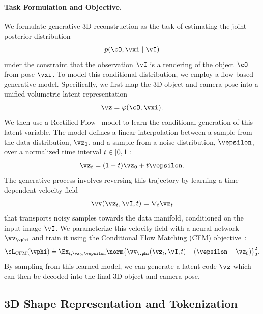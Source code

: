 \documentclass[../../book-main.tex]{subfiles}
\begin{document}
\paragraph{Task Formulation and Objective.}
We formulate generative 3D reconstruction as the task of estimating
the joint posterior distribution
\begin{equation}
p(\object, \pose \mid \image)
\end{equation}
under the constraint that the observation \(\image\) is a rendering of
the object \(\object\) from pose \(\pose\).
To model this conditional distribution, we employ a flow-based generative model.
Specifically, we first map the 3D object and camera pose into a unified volumetric
latent representation
\begin{equation}
\latent = \encoder(\object, \pose) .
\end{equation}
We then use a Rectified Flow~\citep{lipmanflow} model to learn the conditional
generation of this latent variable.
The model defines a linear interpolation between a sample from the data distribution,
\(\latentzero\), and a sample from a noise distribution, \(\noise\), over
a normalized time interval \(t \in [0, 1]\):
\begin{equation}
\latentt = (1 - \timestep) \latentzero + \timestep \noise .
\end{equation}
The generative process involves reversing this trajectory by learning
a time-dependent velocity field
\begin{equation}
\velocity(\latentt, \image, \timestep) = \nabla_{\timestep} \latentt
\end{equation}
that transports noisy samples towards the data manifold, conditioned
on the input image \(\image\).
We parameterize this velocity field with
a neural network \(\velocity_{\parameter}\) and train it using the
Conditional Flow Matching (CFM) objective~\citep{lipmanflow}:
\begin{equation}
\cL_{\mathrm{CFM}}(\parameter) \doteq \Ex_{\timestep, \latentzero, \noise} \norm{\velocity_{\parameter}(\latentt, \image, \timestep) - (\noise - \latentzero)}_{2}^{2} .
\end{equation}
By sampling from this learned model, we can generate a latent code
\(\latent\) which can then be decoded into the final 3D object and camera pose.

\subsection{3D Shape Representation and Tokenization}
\end{document}
